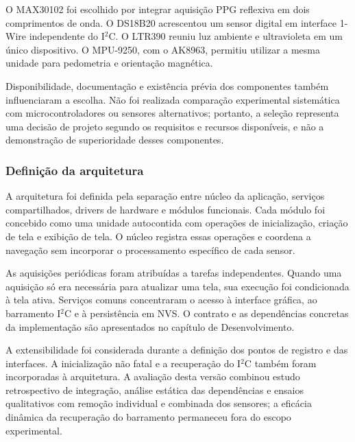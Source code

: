 \documentclass[a4paper,12pt]{article}
\begin{document}
O MAX30102 foi escolhido por integrar aquisi\c{c}\~ao PPG reflexiva em dois comprimentos de onda. O DS18B20 acrescentou um sensor digital em interface 1-Wire independente do I$^2$C. O LTR390 reuniu luz ambiente e ultravioleta em um \'unico dispositivo. O MPU-9250, com o AK8963, permitiu utilizar a mesma unidade para pedometria e orienta\c{c}\~ao magn\'etica.


Disponibilidade, documenta\c{c}\~ao e exist\^encia pr\'evia dos componentes tamb\'em influenciaram a escolha. N\~ao foi realizada compara\c{c}\~ao experimental sistem\'atica com microcontroladores ou sensores alternativos; portanto, a sele\c{c}\~ao representa uma decis\~ao de projeto segundo os requisitos e recursos dispon\'iveis, e n\~ao a demonstra\c{c}\~ao de superioridade desses componentes.


\subsubsection{Defini\c{c}\~ao da arquitetura}


A arquitetura foi definida pela separa\c{c}\~ao entre n\'ucleo da aplica\c{c}\~ao, servi\c{c}os compartilhados, drivers de hardware e m\'odulos funcionais. Cada m\'odulo foi concebido como uma unidade autocontida com opera\c{c}\~oes de inicializa\c{c}\~ao, cria\c{c}\~ao de tela e exibi\c{c}\~ao de tela. O n\'ucleo registra essas opera\c{c}\~oes e coordena a navega\c{c}\~ao sem incorporar o processamento espec\'ifico de cada sensor.


As aquisi\c{c}\~oes peri\'odicas foram atribu\'idas a tarefas independentes. Quando uma aquisi\c{c}\~ao s\'o era necess\'aria para atualizar uma tela, sua execu\c{c}\~ao foi condicionada \`a tela ativa. Servi\c{c}os comuns concentraram o acesso \`a interface gr\'afica, ao barramento I$^2$C e \`a persist\^encia em NVS. O contrato e as depend\^encias concretas da implementa\c{c}\~ao s\~ao apresentados no cap\'itulo de Desenvolvimento.


A extensibilidade foi considerada durante a defini\c{c}\~ao dos pontos de registro e das interfaces. A inicializa\c{c}\~ao n\~ao fatal e a recupera\c{c}\~ao do I$^2$C tamb\'em foram incorporadas \`a arquitetura. A avalia\c{c}\~ao desta vers\~ao combinou estudo retrospectivo de integra\c{c}\~ao, an\'alise est\'atica das depend\^encias e ensaios qualitativos com remo\c{c}\~ao individual e combinada dos sensores; a efic\'acia din\^amica da recupera\c{c}\~ao do barramento permaneceu fora do escopo experimental.
\end{document}
